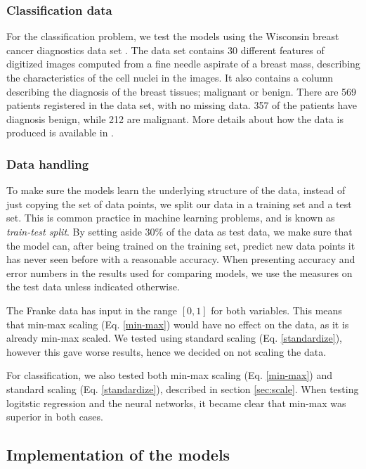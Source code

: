 \subsubsection{Classification data}
For the classification problem, we test the models using the Wisconsin breast cancer diagnostics data set \cite{breast_cancer_wisconsin}.
The data set contains 30 different features of digitized images computed from a fine needle aspirate of a breast mass, describing the characteristics of the cell nuclei in the images.
It also contains a column describing the diagnosis of the breast tissues; malignant or benign.
There are 569 patients registered in the data set, with no missing data.
357 of the patients have diagnosis benign, while 212 are malignant.
More details about how the data is produced is available in \textcite{Street1993NuclearFE}.

\subsubsection{Data handling}
To make sure the models learn the underlying structure of the data, instead of just copying the set of data points, we split our data in a training set and a test set.
This is common practice in machine learning problems, and is known as \textit{train-test split}.
By setting aside 30\% of the data as test data, we make sure that the model can, after being trained on the training set, predict new data points it has never seen before with a reasonable accuracy.
When presenting accuracy and error numbers in the results used for comparing models, we use the measures on the test data unless indicated otherwise.

The Franke data has input in the range $[0, 1]$ for both variables.
This means that min-max scaling (Eq. \ref{min-max}) would have no effect on the data, as it is already min-max scaled.
We tested using standard scaling (Eq. \ref{standardize}), however this gave worse results, hence we decided on not scaling the data.

For classification, we also tested both min-max scaling (Eq. \ref{min-max}) and standard scaling (Eq. \ref{standardize}), described in section \ref{sec:scale}.
When testing logitstic regression and the neural networks, it became clear that min-max was superior in both cases.

\subsection{Implementation of the models}
